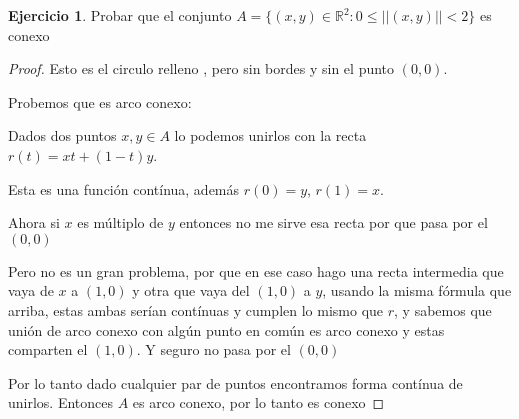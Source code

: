 \documentclass[11pt]{report}
\newcommand{\R}{\mathbb{R}}
\theoremstyle{definition}
\newtheorem{ej}{Ejercicio}
\begin{document}
\begin{ej}
	Probar que el conjunto $A = \{(x,y) \in \R^2 : 0 \leq ||(x,y)|| < 2\}$ es conexo

	\begin{proof}
		Esto es el circulo relleno , pero sin bordes y sin el punto $(0,0)$.

		Probemos que es arco conexo: 

		Dados dos puntos $x,y \in A$ lo podemos unirlos con la recta $r(t) = xt + (1-t)y$.

		Esta es una función contínua, además $r(0) = y$, $r(1) = x$.

		Ahora si $x$ es múltiplo de $y$ entonces no me sirve esa recta por que pasa por el $(0,0)$

		Pero no es un gran problema, por que en ese caso hago una recta intermedia que vaya de $x$ a $(1,0)$ y otra que vaya del $(1,0)$ a $y$, usando la misma fórmula que arriba, estas ambas serían contínuas y cumplen lo mismo que $r$, y sabemos que unión de arco conexo con algún punto en común es arco conexo y estas comparten el $(1,0)$. Y seguro no pasa por el $(0,0)$

		Por lo tanto dado cualquier par de puntos encontramos forma contínua de unirlos. Entonces $A$ es arco conexo, por lo tanto es conexo

	\end{proof}
\end{ej}
\end{document}
